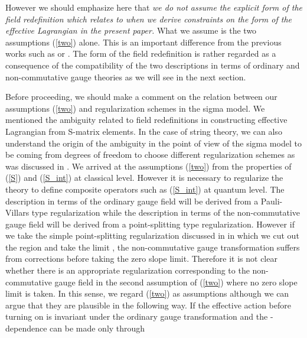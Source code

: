 \documentclass[a4paper,12pt]{article}
\begin{document}
However we should emphasize here that
{\em we do not assume the explicit form of
the field redefinition which relates \coordHE{} to \coordHE{}
when we derive constraints on the form of the effective Lagrangian
in the present paper.}
What we assume is the two assumptions (\ref{two}) alone.
This is an important difference from the previous works
such as \cite{SW} or \cite{Okawa}.
The form of the field redefinition is
rather regarded as a consequence of the compatibility
of the two descriptions in terms of ordinary and non-commutative
gauge theories as we will see in the next section.

Before proceeding,
we should make a comment on the relation between
our assumptions (\ref{two}) and regularization schemes
in the sigma model.
We mentioned the ambiguity related to field redefinitions
in constructing effective Lagrangian from S-matrix elements.
In the case of string theory,
we can also understand the origin of the ambiguity
in the point of view of the sigma model
to be coming from degrees of freedom to choose
different regularization schemes
as was discussed in \cite{SW}.
We arrived at the assumptions (\ref{two}) from the properties
of (\ref{S}) and (\ref{S_int}) at classical level.
However it is necessary to regularize the theory
to define composite operators
such as (\ref{S_int}) at quantum level.
The description in terms of the ordinary gauge field \coordHE{}
will be derived from a Pauli-Villars type regularization
while the description in terms of the non-commutative gauge
field \coordHE{} will be derived from a point-splitting type
regularization.
However if we take the simple point-splitting regularization
discussed in \cite{SW}
in which we cut out the region \coordHE{}
and take the limit \coordHE{},
the non-commutative gauge transformation suffers from
\coordHE{} corrections before taking the zero slope limit.
Therefore it is not clear whether there is
an appropriate regularization corresponding
to the non-commutative gauge field \coordHE{}
in the second assumption of (\ref{two})
where no zero slope limit is taken.
In this sense, we regard (\ref{two}) as assumptions
although we can argue that they are plausible
in the following way.
If the effective action before turning on \coordHE{}
is invariant under the ordinary gauge transformation
and the \coordHE{}-dependence can be made only through
\end{document}
